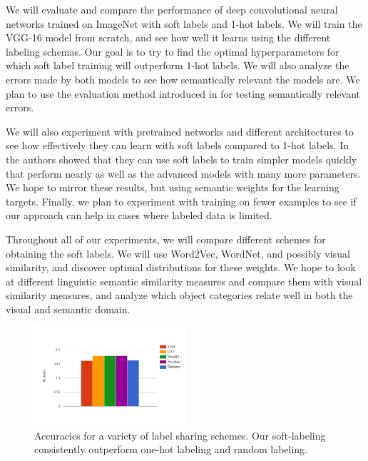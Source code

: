 We will evaluate and compare the performance of deep convolutional neural
networks trained on ImageNet with soft labels and 1-hot labels.
We will train the VGG-16 model \cite{simonyan2014very} from scratch, and see
how well it learns using the different labeling schemas. Our goal is to try to
find the optimal hyperparameters for which soft label training will outperform
1-hot labels.
We will also analyze the errors made by both models to see how semantically
relevant the models are.
We plan to use the evaluation method introduced in \cite{zhao2011large} for
testing semantically relevant errors.

We will also experiment with pretrained networks and different architectures to
see how effectively they can learn with soft labels compared to 1-hot labels.
In \cite{hinton2015distilling} the authors showed that they can use soft labels
to train simpler models quickly that perform nearly as well as the advanced
models with many more parameters. We hope to mirror these results, but using
semantic weights for the learning targets.
Finally, we plan to experiment with training on fewer examples to see if our
approach can help in cases where labeled data is limited.

Throughout all of our experiments, we will compare different schemes for
obtaining the soft labels. We will use Word2Vec, WordNet, and possibly visual
similarity, and discover optimal distributions for these weights.
We hope to look at different linguistic semantic similarity measures and
compare them with visual similarity measures, and analyze which object
categories relate well in both the visual and semantic domain.


\begin{figure}[!tb]
  \centering
  \includegraphics[width=0.5\textwidth]{figs/5_1-train_100.png}
  \caption{
      Accuracies for a variety of label sharing schemes. Our soft-labeling
      consistently outperform one-hot labeling and random labeling.
  }
  \label{fig:5_1-train_100}
\end{figure}


